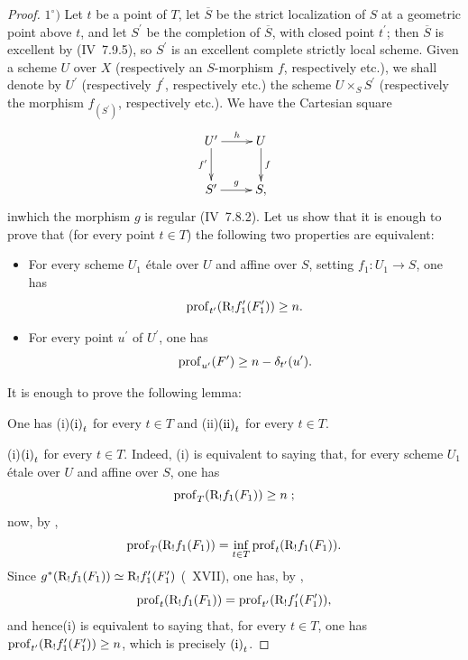 \begin{proof}
$1^\circ)$ Let $t$ be a point of $T$, let $\overline{S}$ be the strict localization of $S$ at a geometric point above $t$, and let $S^{\prime}$ be the completion of $\overline{S}$, with closed point $t^{\prime}$; then $\overline{S}$ is excellent by (\EGA IV~7.9.5), so $S^{\prime}$ is an excellent complete strictly local scheme. Given a scheme $U$ over $X$ (respectively an $S$-morphism $f$, respectively etc.), we shall denote by $U^{\prime}$ (respectively $f^{\prime}$, respectively etc.) the scheme $U\times_{S}S^{\prime}$ (respectively the morphism $f_{(S^{\prime})}$, respectively etc.). We have the Cartesian square
$$
\xymatrix{ U^{\prime}\ar[r]^-{h}\ar[d]_-{f^{\prime}} & U\ar[d]^-{f}\\
S^{\prime}\ar[r]^-{g} & S, }
$$
in\pageoriginale which the morphism $g$ is regular (\EGA IV~7.8.2). Let us show that it is enough to prove that (for every point $t\in T$) the following two properties are equivalent:
\begin{itemize}
\item[$\textup{(i)}_{t}$] For every scheme $U_{1}$ étale over $U$ and affine over $S$, setting $f_{1}\colon U_{1}\to S$, one has
$$
\operatorname{prof}_{t^{\prime}}(\mathrm R_{!}f_{1}^{\prime}(F_{1}^{\prime}))\geq n.
$$

\item[$\textup{(ii)}_{t}$] For every point $u^{\prime}$ of $U^{\prime}$, one has
$$
\operatorname{prof}_{u^{\prime}}(F^{\prime})\geq n-\delta_{t^{\prime}}(u^{\prime}).
$$
\end{itemize}
It is enough to prove the following lemma:

\begin{sublemme} \label{XIV.4.2.1}
One has \textup{(i)}\SSI$\textup{(i)}_{t}$ for every $t\in T$ and \textup{(ii)}\SSI$\textup{(ii)}_{t}$ for every $t\in T$.
\end{sublemme}

\textup{(i)}\SSI$\textup{(i)}_{t}$ for every $t\in T$. Indeed, \textup{(i)} is equivalent to saying that, for every scheme $U_{1}$ étale over $U$ and affine over $S$, one has
$$
\operatorname{prof}_{T}(\mathrm R_{!}f_{1}(F_{1}))\geq n\;;$$
now, by ,
$$
\operatorname{prof}_{T}(\mathrm R_{!}f_{1}(F_{1}))=\inf_{t\in T}\operatorname{prof}_{t}(\mathrm R_{!}f_{1}(F_{1})).
$$
Since $g^{\ast}(\mathrm R_{!}f_{1}(F_{1}))\simeq\mathrm R_{!}f_{1}^{\prime}(F_{1}^{\prime})$ (~XVII), one has, by ,
$$
\operatorname{prof}_{t}(\mathrm R_{!}f_{1}(F_{1}))=\operatorname{prof}_{t^{\prime}}(\mathrm R_{!}f_{1}^{\prime}(F_{1}^{\prime})),
$$
and hence\pageoriginale \textup{(i)} is equivalent to saying that, for every $t\in T$, one has $\operatorname{prof}_{t^{\prime}}(\mathrm R_{!}f_{1}^{\prime}(F_{1}^{\prime}))\geq n$, which is precisely $\textup{(i)}_{t}$.


\end{proof}
